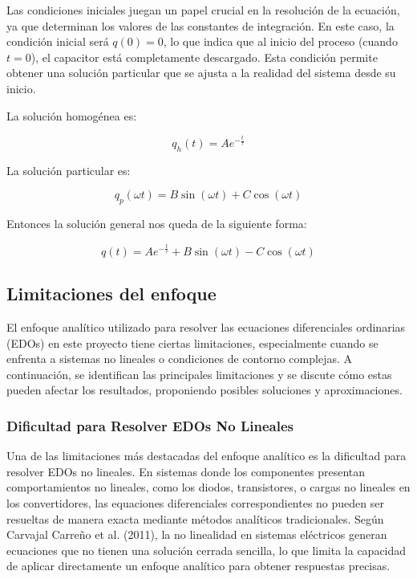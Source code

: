 Las condiciones iniciales juegan un papel crucial en la resolución de la ecuación, ya que
determinan los valores de las constantes de integración. En este caso, la condición inicial será
\(q(0) = 0\), lo que indica que al inicio del proceso (cuando \(t = 0\)), el capacitor está
completamente descargado. Esta condición permite obtener una solución particular que se
ajusta a la realidad del sistema desde su inicio.

La solución homogénea es:

\[
	q_h(t) = A e^{-\frac{t}{\tau}}
\]

La solución particular es:

\[
	q_p(\omega t) = B \sin(\omega t) + C \cos(\omega t)
\]

%
%
%

Entonces la solución general nos queda de la siguiente forma:

\[
	q(t) = A e^{-\frac{t}{\tau}} + B \sin(\omega t) - C \cos(\omega t)
\]

\subsection{Limitaciones del enfoque}
El enfoque analítico utilizado para resolver las ecuaciones diferenciales ordinarias (EDOs) en este
proyecto tiene ciertas limitaciones, especialmente cuando se enfrenta a sistemas no lineales o
condiciones de contorno complejas. A continuación, se identifican las principales limitaciones y se
discute cómo estas pueden afectar los resultados, proponiendo posibles soluciones y aproximaciones.

\subsubsection*{Dificultad para Resolver EDOs No Lineales}
Una de las limitaciones más destacadas del enfoque analítico es la dificultad para resolver
EDOs no lineales. En sistemas donde los componentes presentan comportamientos no
lineales, como los diodos, transistores, o cargas no lineales en los convertidores, las
equaciones diferenciales correspondientes no pueden ser resueltas de manera exacta mediante
métodos analíticos tradicionales. Según Carvajal Carreño et al. (2011), la no linealidad en
sistemas eléctricos generan ecuaciones que no tienen una solución cerrada sencilla, lo que
limita la capacidad de aplicar directamente un enfoque analítico para obtener respuestas
precisas.

